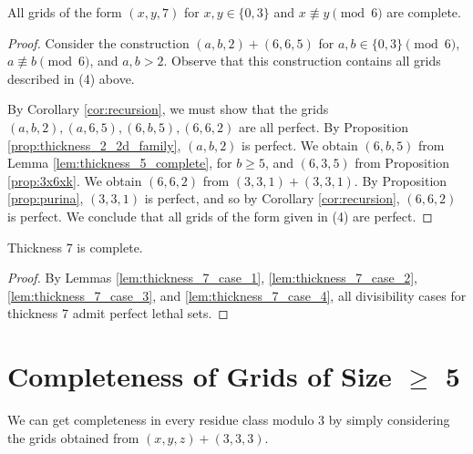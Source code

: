 \begin{lem}
\label{lem:thickness_7_case_4}
All grids of the form $(x,y,7)$ for $x,y \in \{0,3\}$ and $x \not\equiv y \pmod 6$ are complete.
\end{lem}

\begin{proof}
Consider the construction $(a,b,2) + (6,6,5)$ for $a,b \in \{0,3\} \pmod 6$, $a \not\equiv b \pmod 6$, and $a,b > 2$. Observe that this construction contains all grids described in (4) above. 

By Corollary \ref{cor:recursion}, we must show that the grids $(a,b,2), (a,6,5), (6,b,5), (6,6,2)$ are all perfect. By Proposition \ref{prop:thickness_2_2d_family}, $(a,b,2)$ is perfect. We obtain $(6,b,5)$ from Lemma \ref{lem:thickness_5_complete}, for $b \geq 5$, and $(6,3,5)$ from Proposition \ref{prop:3x6xk}. We obtain $(6,6,2)$ from $(3,3,1)+(3,3,1)$. By Proposition \ref{prop:purina}, $(3,3,1)$ is perfect, and so by Corollary \ref{cor:recursion}, $(6,6,2)$ is perfect. We conclude that all grids of the form given in (4) are perfect.
\end{proof}

\begin{lem}
Thickness 7 is complete.
\end{lem}

\begin{proof}
By Lemmas \ref{lem:thickness_7_case_1}, \ref{lem:thickness_7_case_2}, \ref{lem:thickness_7_case_3}, and \ref{lem:thickness_7_case_4}, all divisibility cases for thickness 7 admit perfect lethal sets.
\end{proof}

\section{Completeness of Grids of Size $\geq$ 5}

We can get completeness in every residue class modulo 3 by simply considering the grids obtained from $(x,y,z)+(3,3,3)$.


